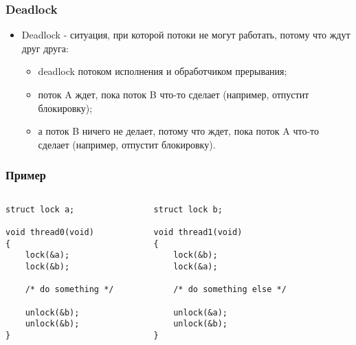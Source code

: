 \begin{frame}
\frametitle{Deadlock}
\begin{itemize}
    \item<1->Deadlock - ситуация, при которой потоки не могут работать,
         потому что ждут друг друга:
    \begin{itemize}
        \item<2->deadlock потоком исполнения и обработчиком прерывания;
        \item<3->поток A ждет, пока поток B что-то сделает (например, отпустит
             блокировку);
        \item<4->а поток B ничего не делает, потому что ждет, пока поток A
             что-то сделает (например, отпустит блокировку).
    \end{itemize}
\end{itemize}
\end{frame}

\begin{frame}[fragile]
\frametitle{Пример}
\begin{columns}
    \begin{column}{.35\textwidth}
        \begin{lstlisting}
struct lock a;

void thread0(void)
{
    lock(&a);
    lock(&b);

    /* do something */

    unlock(&b);
    unlock(&b);
}
        \end{lstlisting}
    \end{column}
    \begin{column}{.35\textwidth}
        \begin{lstlisting}
struct lock b;

void thread1(void)
{
    lock(&b);
    lock(&a);

    /* do something else */

    unlock(&a);
    unlock(&b);
}
        \end{lstlisting}
    \end{column}
    \begin{column}{.3\textwidth}
    \end{column}
\end{columns}
\end{frame}

